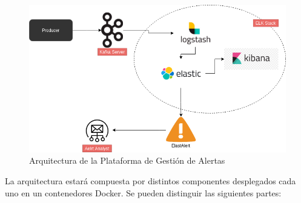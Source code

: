 \begin{figure}[H]
\centerline{\includegraphics[width=15cm]{figuras/arquitectura.png}}
\caption{Arquitectura de la Plataforma de Gestión de Alertas}
\label{enlace1}
\end{figure}

La arquitectura estará compuesta por distintos componentes desplegados cada uno en un contenedores Docker. Se pueden distinguir las siguientes partes:

